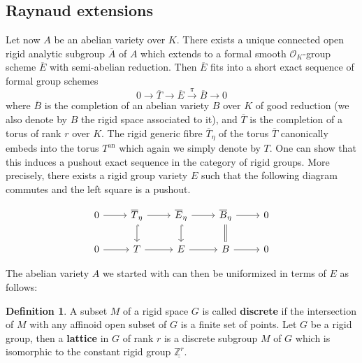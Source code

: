 \documentclass[10pt,oneside]{amsart}
\theoremstyle{definition}
\newtheorem{definition}[theorem]{Definition}
\begin{document}
	\subsection{Raynaud extensions}
	Let now $A$ be an abelian variety over $K$. There exists a unique connected open rigid analytic subgroup $\overline A$ of $A$ which extends to a formal smooth $\mathcal O_K$-group scheme $\overline E$ with semi-abelian reduction. Then $\overline E$ fits into a short exact sequence of formal group schemes
	\begin{equation}\label{formal Raynaud extension}
	0\rightarrow \overline T \rightarrow \overline E \xrightarrow{\pi} \overline{B}\rightarrow 0
	\end{equation}
	where $\overline{B}$ is the completion of an abelian variety $B$ over $K$ of good reduction (we also denote by $B$ the rigid space associated to it), and $\overline{T}$ is the completion of a torus of rank $r$ over $K$.
	The rigid generic fibre $\overline{T}_\eta$ of the torus $\overline{T}$ canonically embeds into the torus $T^{\operatorname{an}}$ which again we simply denote by $T$. One can show that this induces a pushout exact sequence in the category of rigid groups. More precisely, there exists a rigid group variety $E$ such that the following diagram commutes and the left square is a pushout.
	\begin{center}
		\begin{equation}
		\begin{tikzcd}
			0 \arrow[r] & \overline{T}_\eta \arrow[d, hook] \arrow[r] & \overline{E}_\eta \arrow[d, hook] \arrow[r] & \overline{B}_\eta \arrow[d,equal] \arrow[r] & 0 \\
			0 \arrow[r] & T \arrow[r] & E \arrow[r] & B \arrow[r] & 0
		\end{tikzcd}
		\end{equation}
	\end{center}
	
	The abelian variety $A$ we started with can then be uniformized in terms of $E$ as follows:
	
	\begin{definition}
		A subset $M$ of a rigid space $G$ is called \textbf{discrete} if the intersection of $M$ with any affinoid open subset of $G$ is a finite set of points.
		Let $G$ be a rigid group, then a \textbf{lattice} in $G$ of rank $r$ is a discrete subgroup $M$ of $G$ which is isomorphic to the constant rigid group $\underline{\mathbb Z^r}$. 
	\end{definition}
	
\end{document}
